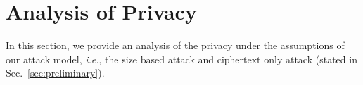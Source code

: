 \section{Analysis of Privacy}
\label{sec:analysis}

In this section, we provide an analysis of the privacy under the
assumptions of our attack model, {\it i.e.}, the size based attack and
ciphertext only attack (stated in Sec.~\ref{sec:preliminary}).
